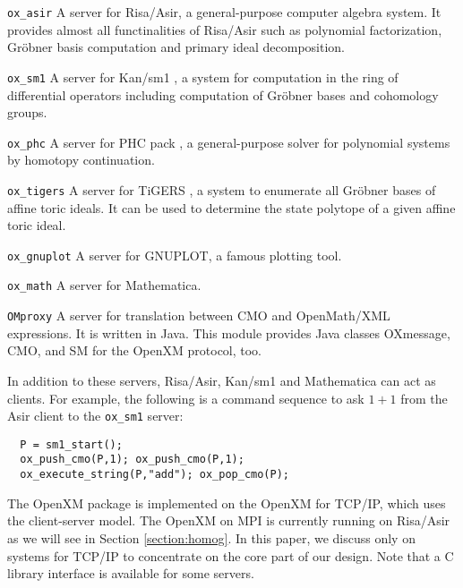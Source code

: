 \begin{description}
\item{\tt ox\_asir}
A server for Risa/Asir, a general-purpose computer algebra
system. It provides almost
all functinalities of Risa/Asir such as polynomial factorization,
Gr\"obner basis computation and primary ideal decomposition.
\item{\tt ox\_sm1}
A server for Kan/sm1 \cite{kan}, a system for computation in 
the ring of differential operators including computation of Gr\"obner bases
and cohomology groups.
\item {\tt ox\_phc}
A server for PHC pack \cite{phc}, a general-purpose solver for
polynomial systems by homotopy continuation. 
\item {\tt ox\_tigers}
A server for TiGERS \cite{tigers}, a system to enumerate
all Gr\"obner bases of affine toric ideals.
It can be used to determine the state polytope
of a given affine toric ideal.
\item {\tt ox\_gnuplot}
A server for GNUPLOT, a famous plotting tool.
\item {\tt ox\_math}
A server for Mathematica.
\item {\tt OMproxy}
A server for translation between CMO and OpenMath/XML expressions.
It is written in Java.
This module provides Java classes OXmessage, CMO, and SM
for the OpenXM protocol, too.
\end{description}
In addition to these servers, Risa/Asir, Kan/sm1 and Mathematica
can act as clients. 
For example, the following is a command sequence to ask $1+1$ from
the Asir client to the {\tt ox\_sm1} server:
\begin{verbatim}
  P = sm1_start();
  ox_push_cmo(P,1); ox_push_cmo(P,1);
  ox_execute_string(P,"add"); ox_pop_cmo(P);
\end{verbatim}
The OpenXM package is implemented on the  OpenXM for TCP/IP, 
which uses the client-server model.
The OpenXM on MPI \cite{MPI} is currently running on Risa/Asir
as we will see in Section \ref{section:homog}.
In this paper, we discuss only on systems for TCP/IP
to concentrate on the core part of our design.
Note that a C library interface is available for some servers.





